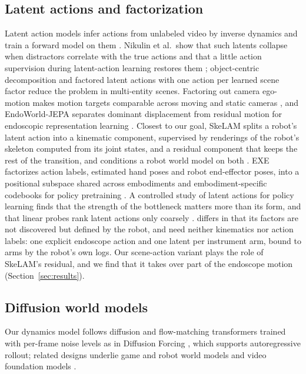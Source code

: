 \subsection{Latent actions and factorization}
Latent action models infer actions from unlabeled video by inverse dynamics and train a forward model on them \cite{genie,lapa,adaworld,villax}. Nikulin et al.\ show that such latents collapse when distractors correlate with the true actions and that a little action supervision during latent-action learning restores them \cite{laom}; object-centric decomposition \cite{oclam} and factored latent actions with one action per learned scene factor \cite{flam} reduce the problem in multi-entity scenes. Factoring out camera ego-motion makes motion targets comparable across moving and static cameras \cite{egowam}, and EndoWorld-JEPA separates dominant displacement from residual motion for endoscopic representation learning \cite{endoworldjepa}. Closest to our goal, SkeLAM splits a robot's latent action into a kinematic component, supervised by renderings of the robot's skeleton computed from its joint states, and a residual component that keeps the rest of the transition, and conditions a robot world model on both \cite{skelam}. EXE factorizes action labels, estimated hand poses and robot end-effector poses, into a positional subspace shared across embodiments and embodiment-specific codebooks for policy pretraining \cite{exe}. A controlled study of latent actions for policy learning finds that the strength of the bottleneck matters more than its form, and that linear probes rank latent actions only coarsely \cite{lamstudy}. \method{} differs in that its factors are not discovered but defined by the robot, and need neither kinematics nor action labels: one explicit endoscope action and one latent per instrument arm, bound to arms by the robot's own logs. Our scene-action variant plays the role of SkeLAM's residual, and we find that it takes over part of the endoscope motion (Section~\ref{sec:results}).

\subsection{Diffusion world models}
Our dynamics model follows diffusion and flow-matching transformers \cite{dit,pixartalpha,rectflow,flowmatching,sd3} trained with per-frame noise levels as in Diffusion Forcing \cite{dforcing}, which supports autoregressive rollout; related designs underlie game and robot world models \cite{diamond,unisim,cosmos,cosmospredict25} and video foundation models \cite{wan}.
